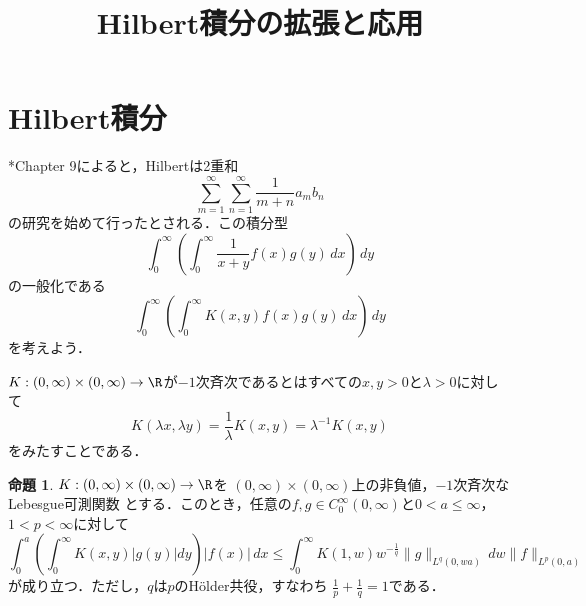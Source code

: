 \documentclass[paper=a4,
fontsize=12pt,
reqno,
uplatex,
dvipdfmx]{jlreq}
\title{Hilbert積分の拡張と応用}
\author{}
\theoremstyle{definition} %
\newtheorem{proposition}[theorem]{命題}
\begin{document}
\maketitle

\section{Hilbert積分}
\cite{MR944909}*{Chapter 9}によると，Hilbertは2重和
\begin{equation}
 \sum_{m=1}^\infty
  \sum_{n=1}^\infty
  \frac{1}{m+n}a_mb_n
\end{equation}
の研究を始めて行ったとされる．この積分型
\begin{equation}
 \int_0^\infty
  \left(
  \int_0^\infty
  \frac{1}{x+y}
  f(x)
  g(y)
  \,dx
  \right)
  \,dy
\end{equation}
の一般化である
\begin{equation}
 \int_0^\infty
  \left(
  \int_0^\infty
  K(x,y)
  f(x)
  g(y)
  \,dx
  \right)
  \,dy
\end{equation}
を考えよう．

$K:(0,\infty)\times(0,\infty)\rightarrow\R$が$-1$次斉次であるとはすべての$x,y>0$と$\lambda>0$に対して
\begin{equation}
 K(\lambda x,\lambda y)
  =
  \frac{1}{\lambda}K(x,y)
  =
  \lambda^{-1}K(x,y)
\end{equation}
をみたすことである．

\begin{proposition}
 $K:(0,\infty)\times(0,\infty)\rightarrow\R$を
 $(0,\infty)\times(0,\infty)$上の非負値，$-1$次斉次なLebesgue可測関数
 とする．このとき，任意の$f,g\in C_0^\infty(0,\infty)$と$0<a\leq\infty$，
 $1<p<\infty$に対して
 \begin{equation}
  \label{eq:HilbertIntegral1}
    \int_0^a
    \left(
     \int_0^\infty
     K(x,y)
     |g(y)|
     dy
    \right)
    |f(x)|
    \,dx
   \leq
   \int_0^\infty
   K(1,w)
   w^{-\frac{1}{q}}
   \|g\|_{L^{q}(0,wa)}
   \,dw
   \|f\|_{L^p(0,a)}
 \end{equation}
 が成り立つ．ただし，$q$は$p$のH\"older共役，すなわち
 $\frac{1}{p}+\frac{1}{q}=1$である．
\end{proposition}
\end{document}
